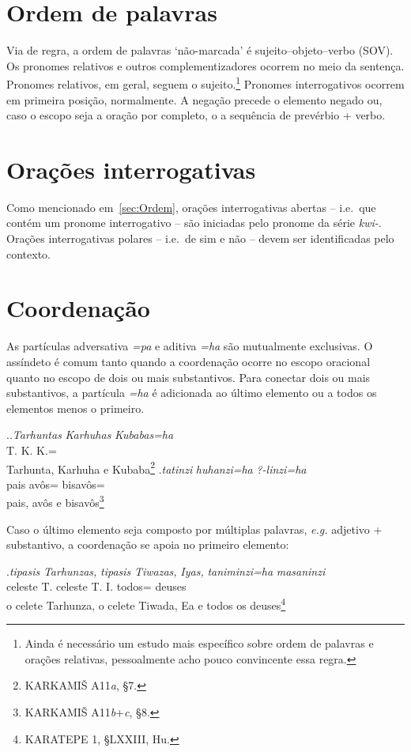 \documentclass{luvita}
\begin{document}
\section{Ordem de palavras}\label{sec:Ordem}

Via de regra, a ordem de palavras `não-marcada' é sujeito--objeto--verbo (SOV).
Os pronomes relativos e outros complementizadores ocorrem no meio da sentença.
Pronomes relativos, em geral, seguem o sujeito.\footnote{Ainda é necessário um
	estudo mais específico sobre ordem de palavras e orações relativas,
	pessoalmente acho pouco convincente essa regra.}
Pronomes interrogativos ocorrem em primeira posição, normalmente.
A negação precede o elemento negado ou, caso o escopo seja a oração por completo,
o a sequência de prevérbio + verbo.

\section{Orações interrogativas}
Como mencionado em~\autoref{sec:Ordem}, orações interrogativas abertas -- i.e.\
que contém um pronome interrogativo -- são iniciadas pelo pronome da série
\emph{kwi-}.
Orações interrogativas polares -- i.e.\ de sim e não -- devem ser identificadas
pelo contexto.

\section{Coordenação}
As partículas adversativa \emph{=pa} e aditiva \emph{=ha} são mutualmente
exclusivas.
O assíndeto é comum tanto quando a coordenação ocorre no escopo oracional quanto
no escopo de dois ou mais substantivos.
Para conectar dois ou mais substantivos, a partícula \emph{=ha} é adicionada ao
último elemento ou a todos os elementos menos o primeiro.

\ex.\ag.\emph{Tarhuntas} \emph{Karhuhas} \emph{Kubabas=ha}\\
T. K. K.=\Conj{}\\
Tarhunta, Karhuha e Kubaba\footnote{KARKAMIŠ A11\emph{a}, §7.}
\bg.\emph{tatinzi} \emph{huhanzi=ha} \emph{{?}-linzi=ha}\\
pais avôs=\Conj{} bisavôs=\Conj{}\\
pais, avôs e bisavôs\footnote{KARKAMIŠ A11\emph{b}+\emph{c}, §8.}


\noindent Caso o último elemento seja composto por múltiplas palavras, \emph{e.g.}
adjetivo + substantivo, a coordenação se apoia no primeiro elemento:


\exg.\emph{tipasis} \emph{Tarhunzas,} \emph{tipasis} \emph{Tiwazas,} \emph{Iyas,} \emph{taniminzi=ha} \emph{masaninzi}\\
celeste T. celeste T. I. todos=\Conj{} deuses\\
o celete Tarhunza, o celete Tiwada, Ea e todos os deuses\footnote{KARATEPE 1,
	§LXXIII, Hu.}
\end{document}
